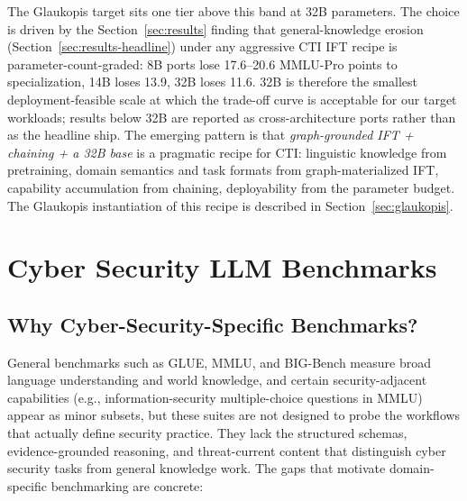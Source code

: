 \documentclass[conference]{IEEEtran}
\begin{document}
The Glaukopis target sits one tier above this band at 32B parameters. The choice is driven by the Section~\ref{sec:results} finding that general-knowledge erosion (Section~\ref{sec:results-headline}) under any aggressive CTI IFT recipe is parameter-count-graded: 8B ports lose 17.6--20.6 MMLU-Pro points to specialization, 14B loses 13.9, 32B loses 11.6. 32B is therefore the smallest deployment-feasible scale at which the trade-off curve is acceptable for our target workloads; results below 32B are reported as cross-architecture ports rather than as the headline ship. The emerging pattern is that \emph{graph-grounded IFT + chaining + a 32B base} is a pragmatic recipe for CTI: linguistic knowledge from pretraining, domain semantics and task formats from graph-materialized IFT, capability accumulation from chaining, deployability from the parameter budget. The Glaukopis instantiation of this recipe is described in Section~\ref{sec:glaukopis}.


\section{Cyber Security LLM Benchmarks}
\label{sec:benchmarks}

\subsection{Why Cyber-Security-Specific Benchmarks?}

General benchmarks such as GLUE, MMLU, and BIG-Bench measure broad language understanding and world knowledge, and certain security-adjacent capabilities (e.g., information-security multiple-choice questions in MMLU) appear as minor subsets, but these suites are not designed to probe the workflows that actually define security practice. They lack the structured schemas, evidence-grounded reasoning, and threat-current content that distinguish cyber security tasks from general knowledge work. The gaps that motivate domain-specific benchmarking are concrete:
\end{document}
